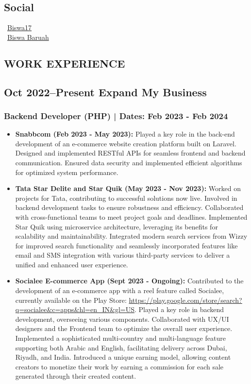 \documentclass[10pt,a4paper]{article}
\begin{document}
\begin{paracol}{2}
\begin{leftcolumn}
\section*{Social}
\textcolor{textgrey}{
\faGithub\ \href{https://github.com/Biswa17}{Biswa17} \\
\faLinkedin\ \href{https://linkedin.com/in/biswa-baruah}{Biswa Baruah}
}

\end{leftcolumn}

\begin{rightcolumn}

\section*{WORK EXPERIENCE}
\subsection*{Oct 2022–Present Expand My Business}
\subsubsection*{Backend Developer (PHP) | Dates: Feb 2023 - Feb 2024}
\textcolor{textgrey}{
\begin{itemize}
    \item \textbf{Snabbcom (Feb 2023 - May 2023):} Played a key role in the back-end development of an e-commerce website creation platform built on Laravel. Designed and implemented RESTful APIs for seamless frontend and backend communication. Ensured data security and implemented efficient algorithms for optimized system performance.
    \item \textbf{Tata Star Delite and Star Quik (May 2023 - Nov 2023):} Worked on projects for Tata, contributing to successful solutions now live. Involved in backend development tasks to ensure robustness and efficiency. Collaborated with cross-functional teams to meet project goals and deadlines. Implemented Star Quik using microservice architecture, leveraging its benefits for scalability and maintainability. Integrated modern search services from Wizzy for improved search functionality and seamlessly incorporated features like email and SMS integration with various third-party services to deliver a unified and enhanced user experience.
    \item \textbf{Socialee E-commerce App (Sept 2023 - Ongoing):} Contributed to the development of an e-commerce app with a reel feature called Socialee, currently available on the Play Store: \url{https://play.google.com/store/search?q=socialee&c=apps&hl=en_IN&gl=US}. Played a key role in backend development, overseeing various components. Collaborated with UX/UI designers and the Frontend team to optimize the overall user experience. Implemented a sophisticated multi-country and multi-language feature supporting both Arabic and English, facilitating delivery across Dubai, Riyadh, and India. Introduced a unique earning model, allowing content creators to monetize their work by earning a commission for each sale generated through their created content.
\end{itemize}
}


\end{rightcolumn}
\end{paracol}
\end{document}
